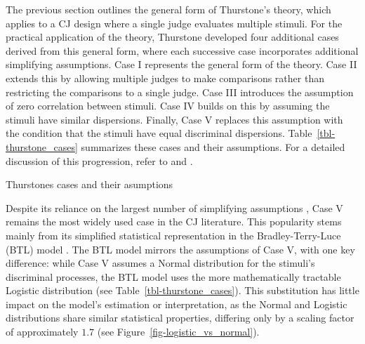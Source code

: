 \documentclass[
  authoryear,
  preprint,
  1p]{elsarticle}
\begin{document}
The previous section outlines the general form of Thurstone's theory,
which applies to a CJ design where a single judge evaluates multiple
stimuli. For the practical application of the theory, Thurstone
developed four additional cases derived from this general form, where
each successive case incorporates additional simplifying assumptions.
Case I represents the general form of the theory. Case II extends this
by allowing multiple judges to make comparisons rather than restricting
the comparisons to a single judge. Case III introduces the assumption of
zero correlation between stimuli. Case IV builds on this by assuming the
stimuli have similar dispersions. Finally, Case V replaces this
assumption with the condition that the stimuli have equal discriminal
dispersions. Table~\ref{tbl-thurstone_cases} summarizes these cases and
their assumptions. For a detailed discussion of this progression, refer
to \citet{Thurstone_1927b} and \citet[pp.~248-253]{Bramley_2008}.

\begin{table}

\caption{\label{tbl-thurstone_cases}Thurstones cases and their
asumptions}


\end{table}%

Despite its reliance on the largest number of simplifying assumptions
\citetext{\citealp[pp.~253]{Bramley_2008}; \citealp[pp.~677]{Kelly_et_al_2022}},
Case V remains the most widely used case in the CJ literature. This
popularity stems mainly from its simplified statistical representation
in the Bradley-Terry-Luce (BTL) model
\citep{Bradley_et_al_1952, Luce_1959}. The BTL model mirrors the
assumptions of Case V, with one key difference: while Case V assumes a
Normal distribution for the stimuli's discriminal processes, the BTL
model uses the more mathematically tractable Logistic distribution
\citep[pp.~254]{Andrich_1978, Bramley_2008} (see
Table~\ref{tbl-thurstone_cases}). This substitution has little impact on
the model's estimation or interpretation, as the Normal and Logistic
distributions share similar statistical properties, differing only by a
scaling factor of approximately \(1.7\)
\citep[pp.~16]{vanderLinden_et_al_2017_I} (see
Figure~\ref{fig-logistic_vs_normal}).
\end{document}
